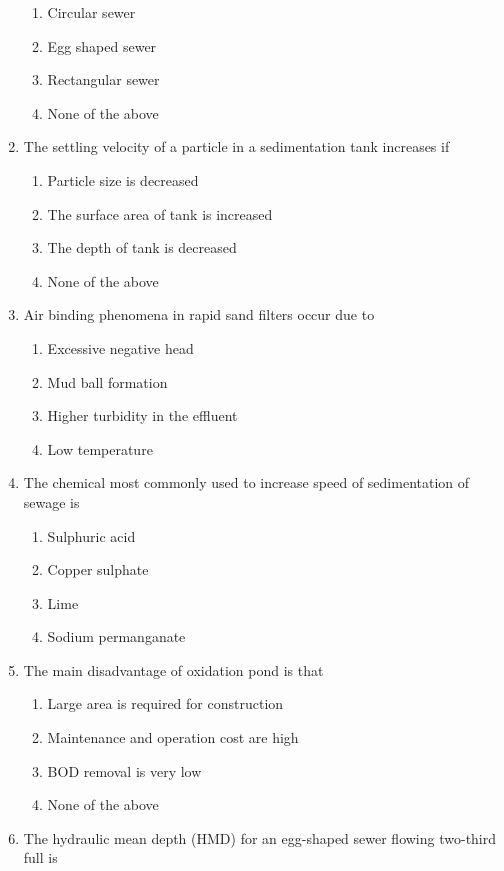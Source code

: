 \documentclass[11pt,a4paper]{article}
\begin{document}
\begin{enumerate}
\begin{enumerate}[label=\Alph*.]
\item{Circular sewer}
\item{Egg shaped sewer}
\item{Rectangular sewer}
\item{None of the above}
\end{enumerate}
\item{The settling velocity of a particle in a sedimentation tank increases if}
\begin{enumerate}[label=\Alph*.]
\item{Particle size is decreased}
\item{The surface area of tank is increased}
\item{The depth of tank is decreased}
\item{None of the above}
\end{enumerate}
\item{Air binding phenomena in rapid sand filters occur due to}
\begin{enumerate}[label=\Alph*.]
\item{Excessive negative head}
\item{Mud ball formation}
\item{Higher turbidity in the effluent}
\item{Low temperature}
\end{enumerate}
\item{The chemical most commonly used to increase speed of sedimentation of sewage is}
\begin{enumerate}[label=\Alph*.]
\item{Sulphuric acid}
\item{Copper sulphate}
\item{Lime}
\item{Sodium permanganate}
\end{enumerate}
\item{The main disadvantage of oxidation pond is that}
\begin{enumerate}[label=\Alph*.]
\item{Large area is required for construction}
\item{Maintenance and operation cost are high}
\item{BOD removal is very low}
\item{None of the above}
\end{enumerate}
\item{The hydraulic mean depth (HMD) for an egg-shaped sewer flowing two-third full is}

\end{enumerate}
\end{document}

